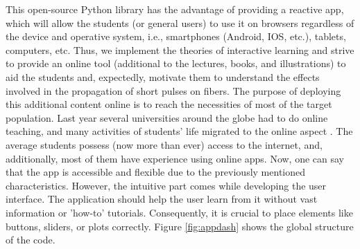     This open-source Python library has the advantage of providing a reactive app, which will allow the students (or general users) to use it on browsers regardless of the device and operative system, i.e., smartphones (Android, IOS, etc.), tablets, computers, etc. Thus, we implement the theories of interactive learning and strive to provide an online tool (additional to the lectures, books, and illustrations) to aid the students and, expectedly, motivate them to understand the effects involved in the propagation of short pulses on fibers. 
    The purpose of deploying this additional content online is to reach the necessities of most of the target population. Last year several universities around the globe had to do online teaching, and many activities of students' life migrated to the online aspect \citep{Hassel2020}. The average students possess (now more than ever) access to the internet, and, additionally, most of them have experience using online apps. Now, one can say that the app is accessible and flexible due to the previously mentioned characteristics. However, the intuitive part comes while developing the user interface. The application should help the user learn from it without vast information or 'how-to' tutorials. Consequently, it is crucial to place elements like buttons, sliders, or plots correctly. Figure \ref{fig:appdash} shows the global structure of the code. 
    
